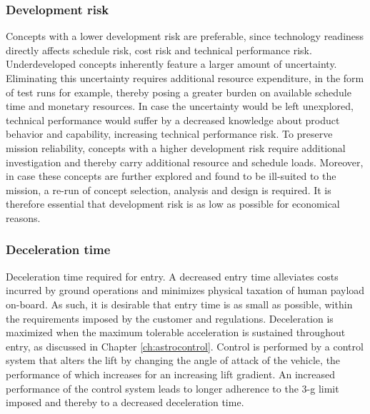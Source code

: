\subsubsection{Development risk}
Concepts with a lower development risk are preferable, since technology readiness directly affects schedule risk, cost risk and technical performance risk. Underdeveloped concepts inherently feature a larger amount of uncertainty. Eliminating this uncertainty requires additional resource expenditure, in the form of test runs for example, thereby posing a greater burden on available schedule time and monetary resources. In case the uncertainty would be left unexplored, technical performance would suffer by a decreased knowledge about product behavior and capability, increasing technical performance risk. To preserve mission reliability, concepts with a higher development risk require additional investigation and thereby carry additional resource and schedule loads. Moreover, in case these concepts are further explored and found to be ill-suited to the mission, a re-run of concept selection, analysis and design is required. It is therefore essential that development risk is as low as possible for economical reasons.

\subsubsection{Deceleration time}
Deceleration time required for entry. A decreased entry time alleviates costs incurred by ground operations and minimizes physical taxation of human payload on-board. As such, it is desirable that entry time is as small as possible, within the requirements imposed by the customer and regulations. Deceleration is maximized when the maximum tolerable acceleration is sustained throughout entry, as discussed in Chapter \ref{ch:astrocontrol}. Control is performed by a control system that alters the lift by changing the angle of attack of the vehicle, the performance of which increases for an increasing lift gradient. An increased performance of the control system leads to longer adherence to the 3-g limit imposed and thereby to a decreased deceleration time.


